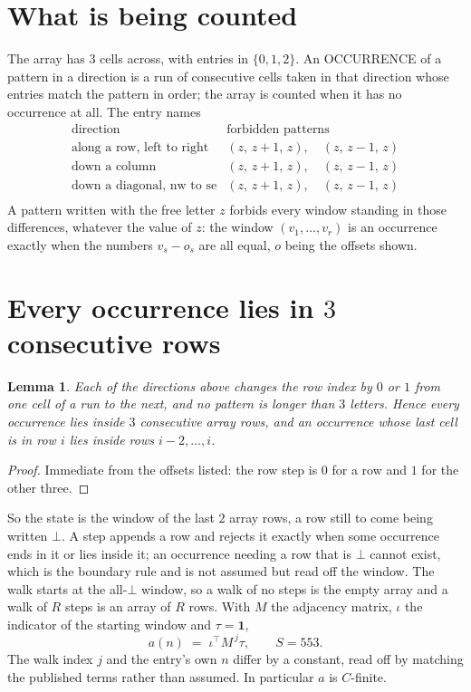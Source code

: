 \documentclass[11pt,a4paper]{article}
\theoremstyle{plain}
\newtheorem{lemma}[theorem]{Lemma}
\theoremstyle{definition}
\begin{document}
\section{What is being counted}

The array has $3$ cells across, with entries in $\{0,1,2\}$. An OCCURRENCE of a pattern in a
direction is a run of consecutive cells taken in that direction whose entries match the pattern
in order; the array is counted when it has no occurrence at all. The entry names
\[
\begin{array}{ll}
\text{direction} & \text{forbidden patterns} \\[2pt]
\text{along a row, left to right} & (z,\,z+1,\,z),\quad (z,\,z-1,\,z) \\
\text{down a column} & (z,\,z+1,\,z),\quad (z,\,z-1,\,z) \\
\text{down a diagonal, nw to se} & (z,\,z+1,\,z),\quad (z,\,z-1,\,z) \\
\end{array}
\]
 A pattern written with the free letter $z$ forbids every window standing in those differences, whatever the value of $z$: the window $(v_1,\dots,v_r)$ is an occurrence exactly when the numbers $v_s-o_s$ are all equal, $o$ being the offsets shown.

\section{Every occurrence lies in $3$ consecutive rows}

\begin{lemma}\label{lem:win}
Each of the directions above changes the row index by $0$ or $1$ from one cell of a run to the
next, and no pattern is longer than $3$ letters. Hence every occurrence lies inside $3$
consecutive array rows, and an occurrence whose last cell is in row $i$ lies inside rows
$i-2,\dots,i$.
\end{lemma}

\begin{proof}
Immediate from the offsets listed: the row step is $0$ for a row and $1$ for the other three.
\end{proof}

So the state is the window of the last $2$ array rows, a row still to come being written
$\bot$. A step appends a row and rejects it exactly when some occurrence ends in it or lies
inside it; an occurrence needing a row that is $\bot$ cannot exist, which is the boundary rule
and is not assumed but read off the window. The walk starts at the all-$\bot$ window, so a walk
of no steps is the empty array and a walk of $R$ steps is an array of $R$ rows. With $M$ the
adjacency matrix, $\iota$ the indicator of the starting window and $\tau=\mathbf{1}$,
\[
a(n)\;=\;\iota^{\!\top}M^{\,j}\tau ,\qquad S=553.
\]
The walk index $j$ and the entry's own $n$ differ by a constant, read off by matching the
published terms rather than assumed. In particular $a$ is $C$-finite.
\end{document}

